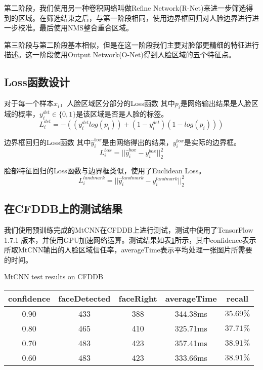 第二阶段，我们使用另一种卷积网络叫做Refine Network(R-Net)来进一步筛选得到的区域。在筛选结束之后，与第一阶段相同，使用边界框回归对人脸边界进行进一步校准。最后使用NMS整合重合区域。

第三阶段与第二阶段基本相似，但是在这一阶段我们主要对脸部更精细的特征进行描述。这一阶段使用Output Network(O-Net)得到人脸区域的五个特征点。

\subsection{Loss函数设计}

对于每一个样本$x_i$，人脸区域区分部分的Loss函数 其中$p_i$是网络输出结果是人脸区域的概率，$y_i^{det}\in\{0,1\}$是该区域是否是人脸的标签\cite{zhang2016joint}。
\begin{equation}
	L_{i}^{det}=-((y_{i}^{det}log(p_{i}))+(1-y_{i}^{det})(1-log(p_i)))
\end{equation}



边界框回归的Loss函数 其中$\hat{y}_i^{box}$是由网络得出的结果，$y_i^{box}$是实际的边界框\cite{zhang2016joint}。
\begin{equation}
	L_{i}^{box}=||{\hat{y}_i^{box}-y_i^{box}}||_2^2
\end{equation}



脸部特征回归的Loss函数与边界框类似，使用了Euclidean Loss\cite{zhang2016joint}。
\begin{equation}
L_{i}^{landmark}=||{\hat{y}_i^{landmark}-y_i^{landmark}}||_2^2
\end{equation}



\subsection{在CFDDB上的测试结果}

我们使用预训练完成的MtCNN在CFDDB上进行测试，测试中使用了TensorFlow 1.7.1 版本，并使用GPU加速网络运算。测试结果如表\ref{tab:mtcnn}所示，其中confidence表示所取MtCNN输出的人脸区域信任率，averageTime表示平均处理一张图片所需要的时间。

\begin{table}[!hpb]
	\centering
	{MtCNN test results on CFDDB}
	\label{tab:mtcnn}
	\begin{tabular}{ cccc | c }
		\hline
		confidence & faceDetected & faceRight & averageTime & recall\\
		\hline
		0.90 & 433 & 388 & 344.38ms & $35.69\%$\\
		0.80 & 465 & 410 & 325.71ms & $37.71\%$\\
		0.70 & 483 & 423 & 357.41ms & $38.91\%$\\
		0.60 & 483 & 423 & 333.66ms & $38.91\%$\\
		\hline
	\end{tabular}
\end{table}

